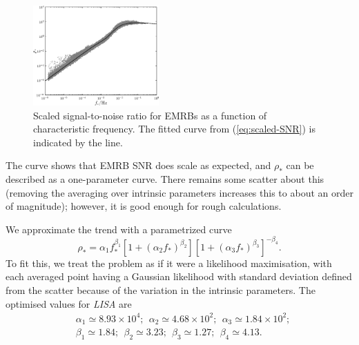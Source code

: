 \documentclass[useAMS,usedcolumn,usegraphicx,usenatbib]{mn2e}
\newcommand{\eqnref}[1]{(\ref{eq:#1})}
\begin{document}
\begin{figure}
\begin{center}
 \includegraphics[width=0.43\textwidth]{Fig_SNR_scaled_fit}
 \caption{Scaled signal-to-noise ratio for EMRBs as a function of characteristic frequency. The fitted curve from \eqnref{scaled-SNR} is indicated by the line.\label{fig:scaled-SNR}}
   \end{center}
\end{figure}
The curve shows that EMRB SNR does scale as expected, and $\rho_\ast$ can be described as a one-parameter curve. There remains some scatter about this (removing the averaging over intrinsic parameters increases this to about an order of magnitude); however, it is good enough for rough calculations.

We approximate the trend with a parametrized curve
\begin{equation}
\rho_\ast = \alpha_1 f_\ast^{\beta_1} \left[1 + \left(\alpha_2 f_\ast\right)^{\beta_2}\right]\left[1 + \left(\alpha_3 f_\ast\right)^{\beta_3}\right]^{-\beta_4}.
\label{eq:scaled-SNR}
\end{equation}
To fit this, we treat the problem as if it were a likelihood maximisation, with each averaged point having a Gaussian likelihood with standard deviation defined from the scatter because of the variation in the intrinsic parameters. The optimised values for \textit{LISA} are
\begin{equation}
\begin{split}
&\alpha_1 \simeq 8.93 \times 10^4; \ \ \alpha_2 \simeq 4.68 \times 10^2; \ \  \alpha_3 \simeq 1.84 \times 10^2;\\
&\beta_1 \simeq 1.84; \ \ \beta_2 \simeq 3.23; \ \ \beta_3 \simeq 1.27; \ \ \beta_4 \simeq 4.13.
\end{split}
\end{equation}
\end{document}
